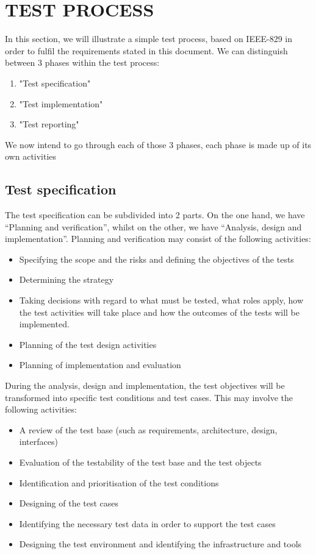 \documentclass[12pt]{article}
\begin{document}
 \section{TEST PROCESS}
In this section, we will illustrate a simple test process, based on IEEE-829 in order to fulfil the requirements stated in this document. \newline\newline
We can distinguish between 3 phases within the test process: \newline
\begin{enumerate}
	\item "Test specification"
	\item "Test implementation"  
	\item "Test reporting" 	
\end{enumerate}
We now intend to go through each of those 3 phases, each phase is made up of its own activities \newline
\subsection{Test specification}
The test specification can be subdivided into 2 parts. On the one hand, we have “Planning and verification”, whilst on the other, we have “Analysis, design and implementation”. \newline
Planning and verification may consist of the following activities: \newline
\begin{itemize}
 \item Specifying the scope and the risks and defining the objectives of the tests 
\item Determining the strategy
\item Taking decisions with regard to what must be tested, what roles apply, how the test activities will take place and how the outcomes of the tests will be implemented. 
\item Planning of the test design activities
\item Planning of implementation and evaluation
\end{itemize}
During the analysis, design and implementation, the test objectives will be transformed into specific test conditions and test cases. This may involve the following activities: \newline
\begin{itemize}
 \item A review of the test base (such as requirements, architecture, design, interfaces) 
\item Evaluation of the testability of the test base and the test objects 
\item Identification and prioritisation of the test conditions 
\item Designing of the test cases
\item Identifying the necessary test data in order to support the test cases 
\item Designing the test environment and identifying the infrastructure and tools 
\end{itemize}
\end{document}
